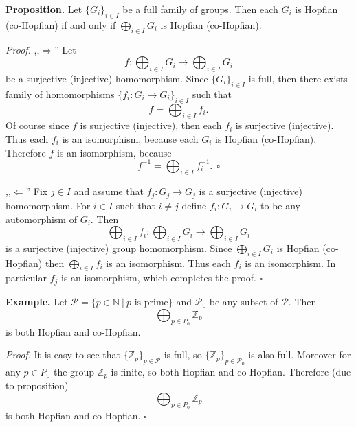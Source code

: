 \documentclass[12pt]{article}
\begin{document}
\textbf{Proposition.} Let $\{ G_i\}_{i\in I}$ be a full family of groups. Then each $G_i$ is Hopfian (co-Hopfian) if and only if $\bigoplus_{i\in I}G_i$ is Hopfian (co-Hopfian).

\textit{Proof.} ,,$\Rightarrow$'' Let $$f:\bigoplus_{i\in I}G_i\to \bigoplus_{i\in I}G_i$$ be a surjective (injective) homomorphism. Since $\{ G_i\}_{i\in I}$ is full, then there exists family of homomorphisms $\{ f_i:G_i\to G_i\}_{i\in I}$ such that $$f=\bigoplus_{i\in I} f_i.$$ Of course since $f$ is surjective (injective), then each $f_i$ is surjective (injective). Thus each $f_i$ is an isomorphism, because each $G_i$ is Hopfian (co-Hopfian). Therefore $f$ is an isomorphism, because $$f^{-1}=\bigoplus_{i\in I} f_{i}^{-1}.\ \ \square$$

,,$\Leftarrow$'' Fix $j\in I$ and assume that $f_j:G_j\to G_j$ is a surjective (injective) homomorphism. For $i\in I$ such that $i\neq j$ define $f_i:G_i\to G_i$ to be any automorphism of $G_i$. Then $$\bigoplus_{i\in I} f_i:\bigoplus_{i\in I}G_i \to \bigoplus_{i\in I} G_i$$ is a surjective (injective) group homomorphism. Since $\bigoplus_{i\in I}G_i$ is Hopfian (co-Hopfian) then $\bigoplus_{i\in I}f_i$ is an isomorphism. Thus each $f_i$ is an isomorphism. In particular $f_j$ is an isomorphism, which completes the proof. $\square$

\textbf{Example.} Let $\mathcal{P}=\{p\in\mathbb{N}\ |\ p\mbox{ is prime}\}$ and $\mathcal{P}_0$ be any subset of $\mathcal{P}$. Then $$\bigoplus_{p\in P_0}\mathbb{Z}_{p}$$ is both Hopfian and co-Hopfian.

\textit{Proof.} It is easy to see that $\{\mathbb{Z}_{p}\}_{p\in\mathcal{P}}$ is full, so $\{\mathbb{Z}_{p}\}_{p\in\mathcal{P}_0}$ is also full. Moreover for any $p\in P_0$ the group $\mathbb{Z}_{p}$ is finite, so both Hopfian and co-Hopfian. Therefore (due to proposition) $$\bigoplus_{p\in P_0}\mathbb{Z}_{p}$$ is both Hopfian and co-Hopfian. $\square$
\end{document}
